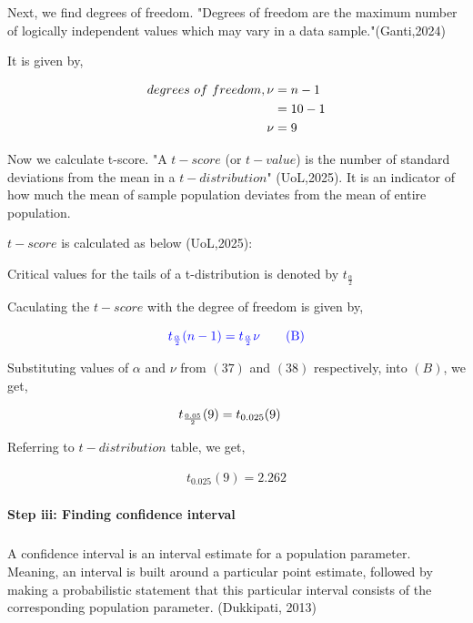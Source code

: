 \documentclass[a4paper]{report}
\begin{document}
Next, we find degrees of freedom. "Degrees of freedom are the maximum number of logically independent values which may vary in a data sample."(Ganti,2024)

It is given by,

\begin{align}
    \notag degrees\ of\ freedom, \nu&=n-1 \\
    \notag &=10-1 \\
    \nu &=9
\end{align}


Now we calculate t-score.
"A $t-score$ (or $t-value$) is the number of standard deviations from the mean in a $t-distribution$" (UoL,2025). It is an indicator of how much the mean of sample population deviates from the mean of entire population.

$t-score$ is calculated as below (UoL,2025):


Critical values for the tails of a t-distribution is denoted by $t_{\frac{\alpha}{2}}$

Caculating the $t-score$ with the degree of freedom is given by,

\begin{equation*}
    \color{blue}  t_{\frac{\alpha}{2}}(n-1)=t_{\frac{\alpha}{2}}\nu  \tag{B}
\end{equation*}



Substituting values of $\alpha$ and $\nu$ from $(37)$ and $(38)$ respectively, into $(B)$, we get,

\begin{align}
    \notag t_{\frac{0.05}{2}}(9)&=t_{0.025}(9)
\end{align}

Referring to $t-distribution$ table, we get,

\begin{align}
    t_{0.025}(9)=2.262 
\end{align}

\newpage
\paragraph{Step iii: Finding confidence interval}

\subparagraph*{}


A confidence interval is an interval estimate for a population parameter. Meaning, an interval is built around a particular point estimate, followed by making a probabilistic statement that this particular interval consists of the corresponding population parameter. (Dukkipati, 2013)
\end{document}
